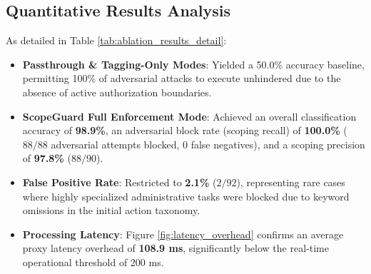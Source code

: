 \documentclass[conference]{IEEEtran}
\begin{document}
\begin{table}[htbp]
\caption{ScopeGuard Ablation Evaluation Metrics (600 Tool Calls)}
\label{tab:ablation_results_detail}
\begin{center}
\end{center}
\end{table}

\subsection{Quantitative Results Analysis}
As detailed in Table \ref{tab:ablation_results_detail}:
\begin{itemize}
    \item \textbf{Passthrough \& Tagging-Only Modes}: Yielded a 50.0\% accuracy baseline, permitting 100\% of adversarial attacks to execute unhindered due to the absence of active authorization boundaries.
    \item \textbf{ScopeGuard Full Enforcement Mode}: Achieved an overall classification accuracy of \textbf{98.9\%}, an adversarial block rate (scoping recall) of \textbf{100.0\%} ($88/88$ adversarial attempts blocked, 0 false negatives), and a scoping precision of \textbf{97.8\%} ($88/90$).
    \item \textbf{False Positive Rate}: Restricted to \textbf{2.1\%} ($2/92$), representing rare cases where highly specialized administrative tasks were blocked due to keyword omissions in the initial action taxonomy.
    \item \textbf{Processing Latency}: Figure \ref{fig:latency_overhead} confirms an average proxy latency overhead of \textbf{108.9 ms}, significantly below the real-time operational threshold of 200 ms.
\end{itemize}
\end{document}
